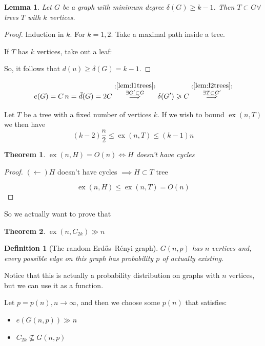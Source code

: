 \documentclass[english, dark, index]{Iart}
\newtheorem{theorem}{Theorem}[part]
\newtheorem{lemma}{Lemma}[theorem]
\newtheorem{definition}{Definition}[part]
\DeclareMathOperator{\ex}{ex}
\begin{document}
	\begin{lemma}\label{lem:l2trees}
		Let $ G $ be a graph with minimum degree $ \delta(G)\geqslant k-1 $. Then $ T\subset G\forall $ trees $ T $ with $ k $ vertices.
	\end{lemma}

	\begin{proof}
		Induction in $ k $. For $ k=1,2 $. Take a maximal path inside a tree.
		
		
		If $ T $ has $ k $ vertices, take out a leaf:
		
		
		So, it follows that $ d(u)\geqslant\delta(G)=k-1 $.
	\end{proof}
	
	\[ e(G)=C\,n=\bar{d}(G)=2C\overset{\overset{(\ref{lem:l1trees})}{\exists G'\subset G}}{\implies}\delta(G')\geqslant C\overset{\overset{(\ref{lem:l2trees})}{\exists T\subset G'}}{\implies} \]
	
	Let $ T $ be a tree with a fixed number of vertices $ k $. If we wish to bound $ \ex(n,T) $ we then have
	\[ (k-2)\dfrac{n}{2}\leqslant \ex(n,T)\leqslant (k-1)n \]
	
	\begin{theorem}
		$ \ex(n,H)=O(n)\iff H $ doesn't have cycles
	\end{theorem}

	\begin{proof}
		$ (\leftarrow) H $ doesn't have cycles $ \implies H\subset T $ tree
		
		\[ \ex(n,H)\leqslant\ex(n,T)=O(n) \] 
	\end{proof}

	So we actually want to prove that
	
	\begin{theorem}
		$ \ex(n,C_{2k})\gg n $
	\end{theorem}

	\begin{definition}[The random Erdős–Rényi graph]
		$ G(n,p) $ has $ n $ vertices and, every possible edge on this graph has probability $ p $ of actually existing. 
	\end{definition}

	Notice that this is actually a probability distribution on graphs with $ n $ vertices, but we can use it as a function.
	
	Let $ p=p(n),n\to\infty $, and then we choose some $ p(n) $ that satisfies:
	\begin{itemize}
		\item $ e(G(n,p))\gg n $
		\item $ C_{2k}\nsubseteq G(n,p) $
	\end{itemize}
\end{document}

